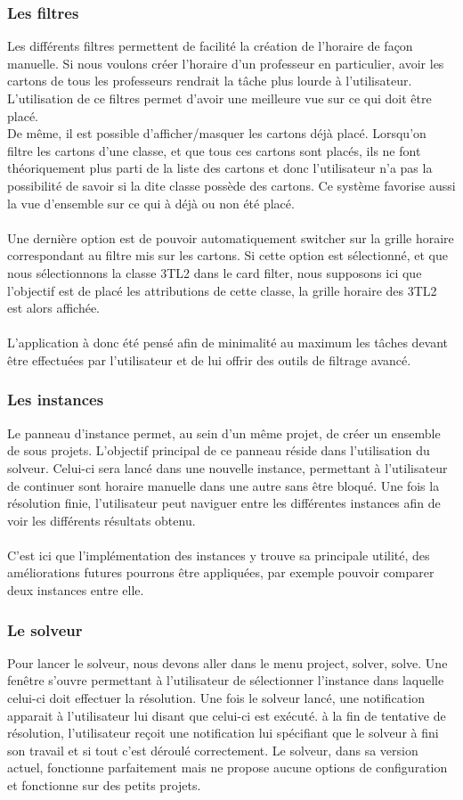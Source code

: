 \subsubsection{Les filtres}
Les différents filtres permettent de facilité la création de l'horaire de façon manuelle. Si nous voulons créer l'horaire d'un professeur en particulier, avoir les cartons de tous les professeurs rendrait la tâche plus lourde à l'utilisateur. L'utilisation de ce filtres permet d'avoir une meilleure vue sur ce qui doit être placé.\\
De même, il est possible d'afficher/masquer les cartons déjà placé. Lorsqu'on filtre les cartons d'une classe, et que tous ces cartons sont placés, ils ne font théoriquement plus parti de la liste des cartons et donc l'utilisateur n'a pas la possibilité de savoir si la dite classe possède des cartons. Ce système favorise aussi la vue d'ensemble sur ce qui à déjà ou non été placé.\\
\\
Une dernière option est de pouvoir automatiquement switcher sur la grille horaire correspondant au filtre mis sur les cartons. Si cette option est sélectionné, et que nous sélectionnons la classe 3TL2 dans le card filter, nous supposons ici que l'objectif est de placé les attributions de cette classe, la grille horaire des 3TL2 est alors affichée.\\
\\
L'application à donc été pensé afin de minimalité au maximum les tâches devant être effectuées par l'utilisateur et de lui offrir des outils de filtrage avancé.
\subsubsection{Les instances}
Le panneau d'instance permet, au sein d'un même projet, de créer un ensemble de sous projets. L'objectif principal de ce panneau réside dans l'utilisation du solveur. Celui-ci sera lancé dans une nouvelle instance, permettant à l'utilisateur de continuer sont horaire manuelle dans une autre sans être bloqué. Une fois la résolution finie, l'utilisateur peut naviguer entre les différentes instances afin de voir les différents résultats obtenu. \\
\\
C'est ici que l'implémentation des instances y trouve sa principale utilité, des améliorations futures pourrons être appliquées, par exemple pouvoir comparer deux instances entre elle.
\subsubsection{Le solveur}
Pour lancer le solveur, nous devons aller dans le menu project, solver, solve. Une fenêtre s'ouvre permettant à l'utilisateur de sélectionner l'instance dans laquelle celui-ci doit effectuer la résolution. Une fois le solveur lancé, une notification apparait à l'utilisateur lui disant que celui-ci est exécuté. à la fin de tentative de résolution, l'utilisateur reçoit une notification lui spécifiant que le solveur à fini son travail et si tout c'est déroulé correctement. Le solveur, dans sa version actuel, fonctionne parfaitement mais ne propose aucune options de configuration et fonctionne sur des petits projets. 
